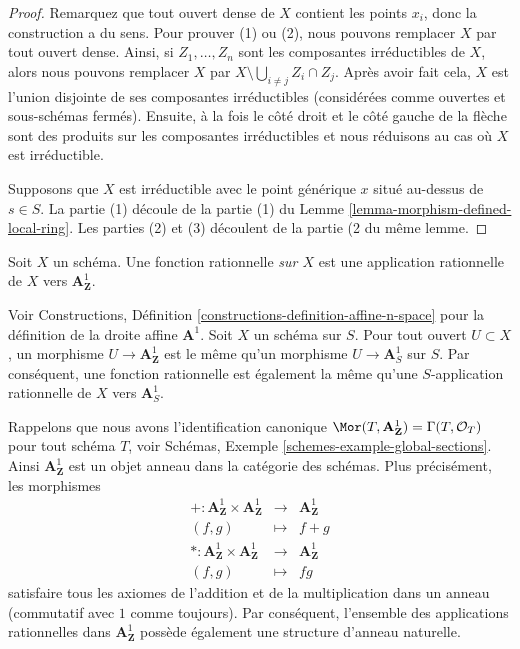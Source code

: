 \begin{proof}
Remarquez que tout ouvert dense de $X$ contient les points $x_i$,
donc la construction a du sens. Pour prouver (1)
ou (2), nous pouvons remplacer $X$ par tout ouvert dense. Ainsi, si
$Z_1, \ldots, Z_n$ sont les composantes irréductibles de $X$, alors
nous pouvons remplacer $X$ par $X \setminus \bigcup_{i \not = j} Z_i \cap Z_j$. Après avoir
fait cela, $X$ est l'union disjointe de ses composantes irréductibles
(considérées comme ouvertes et sous-schémas fermés). Ensuite,
à la fois le côté droit et le côté gauche de la flèche sont des produits
sur les composantes irréductibles et nous réduisons au cas où $X$
est irréductible.

\medskip\noindent Supposons
que $X$ est irréductible avec le point générique $x$ situé
au-dessus de $s \in S$. La partie
(1) découle de la partie (1) du Lemme \ref{lemma-morphism-defined-local-ring}. Les
parties (2) et (3) découlent de la partie (2 du même lemme.
\end{proof}

\begin{definition}
\label{definition-rational-function}
Soit $X$ un schéma. Une fonction rationnelle {\it sur $X$} est une
application rationnelle de $X$ vers $\mathbf{A}^1_{\mathbf{Z}}$.
\end{definition}

\noindent
Voir Constructions, Définition \ref{constructions-definition-affine-n-space} pour la définition de la droite affine
$\mathbf{A}^1$. Soit $X$ un schéma sur $S$. Pour tout ouvert
$U \subset X$, un morphisme $U \to \mathbf{A}^1_{\mathbf{Z}}$ est le
même qu'un morphisme $U \to \mathbf{A}^1_S$ sur $S$. Par conséquent,
une fonction rationnelle est également la même qu'une
$S$-application rationnelle de $X$ vers $\mathbf{A}^1_S$.

\medskip\noindent
Rappelons que nous avons l'identification
canonique $\Mor(T, \mathbf{A}^1_{\mathbf{Z}}) = \Gamma(T, \mathcal{O}_T)$ pour tout schéma $T$,
voir Schémas, Exemple \ref{schemes-example-global-sections}. Ainsi $\mathbf{A}^1_{\mathbf{Z}}$ est
un objet anneau dans la catégorie des schémas.
Plus précisément, les morphismes
\begin{eqnarray*}
+ : \mathbf{A}^1_{\mathbf{Z}} \times \mathbf{A}^1_{\mathbf{Z}}
& \longrightarrow
& \mathbf{A}^1_{\mathbf{Z}}
\\ (f, g) & \longmapsto & f + g \\ *
: \mathbf{A}^1_{\mathbf{Z}} \times \mathbf{A}^1_{\mathbf{Z}}
& \longrightarrow
& \mathbf{A}^1_{\mathbf{Z}}
\\ (f, g) & \longmapsto & fg
\end{eqnarray*}
satisfaire tous les axiomes de l'addition et de la multiplication dans un anneau (commutatif
avec $1$ comme toujours). Par conséquent, l'ensemble des applications
rationnelles dans $\mathbf{A}^1_{\mathbf{Z}}$ possède également une structure d'anneau naturelle.

